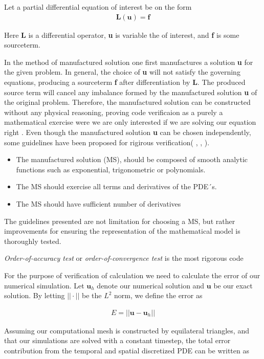 Let a  partial differential equation of interest be on the form
\begin{align*}
\textbf{L}(\textbf{u}) = \textbf{f}
\end{align*}

Here \textbf{L} is a differential operator, \textbf{u} is variable the of interest, and \textbf{f} is some sourceterm.

In the method of manufactured solution one first manufactures a solution \textbf{u} for the given problem. In general, the choice of \textbf{u} will not satisfy the governing equations, producing a sourceterm  \textbf{f} after differentiation by \textbf{L}. The produced source term will cancel any imbalance formed by the manufactured solution \textbf{u} of the original problem. Therefore, the manufactured solution can be constructed without any physical reasoning, proving code verificaion as a purely a mathematical exercise were we are only interested if we are solving our equation right \cite{Roache2002}. Even though the manufactured solution \textbf{u} can be chosen independently, some guidelines have been proposed for rigirous verification( \cite{Etienne2006}, \cite{Biggs}, \cite{Roache2002}). 

\begin{itemize}
\item The manufactured solution (MS), should be composed of smooth analytic functions such as exponential, trigonometric or polynomials.
\item The MS should exercise all terms and derivatives of the PDE´s. 
\item The MS should have sufficient number of derivatives
\end{itemize}
The guidelines presented are not limitation for choosing a MS, but rather improvements for ensuring the representation of the mathematical model is thoroughly tested. 

\textit{Order-of-accuracy test} or \textit{order-of-convergence test} is the most rigorous code 


For the purpose of verification of calculation we need to calculate the error of our numerical simulation. Let $\mathbf{u}_h$ denote our numerical solution and $\mathbf{u}$ be our exact solution. By letting $|| \cdot || $ be the  $L^2$ norm, we define the error as

\begin{align*}
E = ||\mathbf{u} - \mathbf{u}_h  ||
\end{align*}

Assuming our computational mesh is constructed by equilateral triangles, and that our simulations are solved with a constant timestep, the total error contribution from the temporal and spatial 
discretized PDE can be written as

